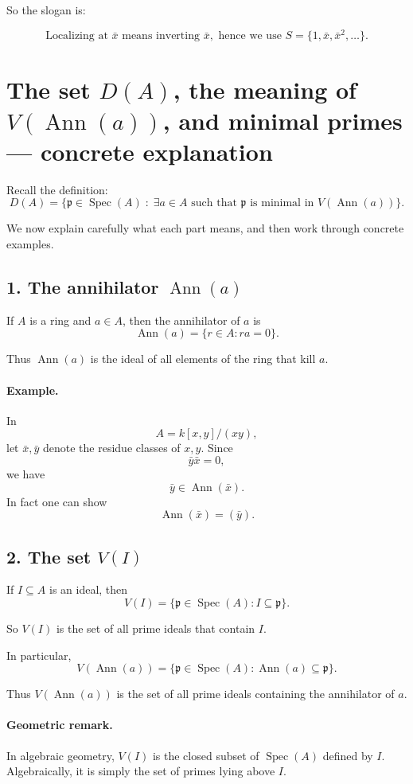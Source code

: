 \documentclass[12pt,a4paper]{article}
\theoremstyle{notespace}
\DeclareMathOperator{\Spec}{Spec}
\DeclareMathOperator{\Ann}{Ann}
\begin{document}
So the slogan is:

\[
\boxed{\text{Localizing at }\bar x\text{ means inverting }\bar x,\text{ hence we use }
	S=\{1,\bar x,\bar x^2,\dots\}.}
\]	
	
	
\section*{The set \(D(A)\), the meaning of \(V(\Ann(a))\), and minimal primes --- concrete explanation}

Recall the definition:
\[
D(A)=\{\mathfrak p\in \Spec(A)\;:\;\exists a\in A \text{ such that }
\mathfrak p \text{ is minimal in } V(\Ann(a))\}.
\]

We now explain carefully what each part means, and then work through concrete examples.

\subsection*{1. The annihilator \(\Ann(a)\)}

If \(A\) is a ring and \(a\in A\), then the annihilator of \(a\) is
\[
\Ann(a)=\{r\in A : ra=0\}.
\]

Thus \(\Ann(a)\) is the ideal of all elements of the ring that kill \(a\).

\paragraph{Example.}
In
\[
A=k[x,y]/(xy),
\]
let \(\bar x,\bar y\) denote the residue classes of \(x,y\). Since
\[
\bar y\bar x=0,
\]
we have
\[
\bar y\in \Ann(\bar x).
\]
In fact one can show
\[
\Ann(\bar x)=(\bar y).
\]

\subsection*{2. The set \(V(I)\)}

If \(I\subseteq A\) is an ideal, then
\[
V(I)=\{\mathfrak p\in \Spec(A): I\subseteq \mathfrak p\}.
\]

So \(V(I)\) is the set of all prime ideals that contain \(I\).

In particular,
\[
V(\Ann(a))=\{\mathfrak p\in \Spec(A): \Ann(a)\subseteq \mathfrak p\}.
\]

Thus \(V(\Ann(a))\) is the set of all prime ideals containing the annihilator of \(a\).

\paragraph{Geometric remark.}
In algebraic geometry, \(V(I)\) is the closed subset of \(\Spec(A)\) defined by \(I\). Algebraically, it is simply the set of primes lying above \(I\).
\end{document}

